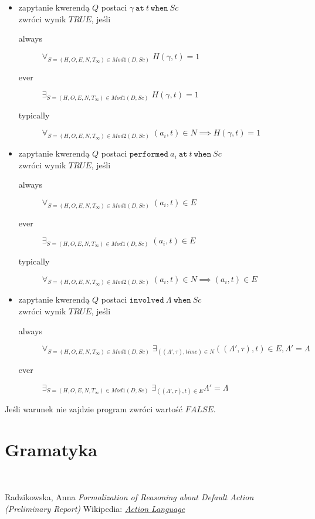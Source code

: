 \begin{itemize}
	\item zapytanie kwerendą $Q$ postaci $\gamma\ \texttt{at}\ t\ \texttt{when}\ Sc$\\ zwróci wynik $TRUE$, jeśli\\
	\begin{description}
		\item[always] $\forall_{S=(H,O,E,N,T_{\infty}) \in Mod1(D, Sc)}\; H(\gamma,t)=1$
		\item[ever] $\exists_{S=(H,O,E,N,T_{\infty}) \in Mod1(D, Sc)}\; H(\gamma,t)=1$
		\item[typically] $\forall_{S=(H,O,E,N,T_{\infty}) \in Mod2(D, Sc)}\; (a_i, t) \in N \implies H(\gamma,t)=1$
	\end{description}
	\item zapytanie kwerendą $Q$ postaci $\texttt{performed}\ a_i\ \texttt{at}\ t\ \texttt{when}\ Sc$\\
	zwróci wynik $TRUE$, jeśli
	\begin{description}
		\item[always] $\forall_{S=(H,O,E,N,T_{\infty}) \in Mod1(D, Sc)}\; (a_i,t) \in E$
		\item[ever] $\exists_{S=(H,O,E,N,T_{\infty}) \in Mod1(D, Sc)}\; (a_i,t) \in E$
		\item[typically] $\forall_{S=(H,O,E,N,T_{\infty}) \in Mod2(D, Sc)}\; (a_i,t) \in N \implies (a_i,t) \in E$
	\end{description}
	\item zapytanie kwerendą $Q$ postaci $\texttt{involved}\ \Lambda \; \texttt{when}\ Sc$\\ zwróci wynik $TRUE$, jeśli
	\begin{description}
		\item[always] $\forall_{S=(H,O,E,N,T_{\infty}) \in Mod1(D, Sc)}\; \exists_{((\Lambda', \tau), time) \in N} ((\Lambda', \tau),t) \in E, \Lambda' = \Lambda$
		\item[ever] $\exists_{S=(H,O,E,N,T_{\infty}) \in Mod1(D, Sc)}\; \exists_{((\Lambda', \tau),t) \in E} \Lambda' = \Lambda$
	\end{description}
\end{itemize}

\begin{remark}
   Jeśli warunek nie zajdzie program zwróci wartość $FALSE$.
\end{remark}
\section{Gramatyka}


\begin{example}~\\

\end{example}

\begin{thebibliography}{4}
%
Radzikowska, Anna
\textsl{Formalization of Reasoning about Default Action (Preliminary Report)}
Wikipedia:
\textsl{\href{http://en.wikipedia.org/wiki/Action_language}{Action Language}}
\end{thebibliography}


